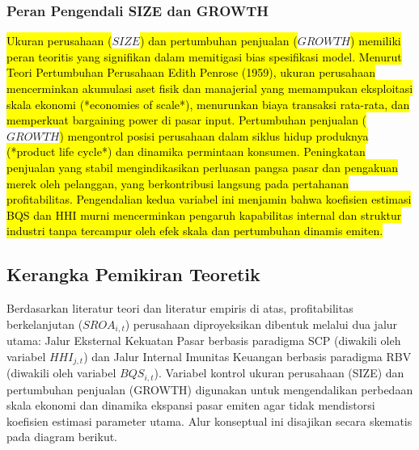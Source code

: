 \documentclass[12pt,a4paper]{article}
\begin{document}
\subsubsection{Peran Pengendali SIZE dan
GROWTH}\label{peran-pengendali-size-dan-growth}

\hl{Ukuran perusahaan (}$SIZE$\hl{) dan pertumbuhan penjualan (}$GROWTH$\hl{) memiliki peran teoritis yang signifikan dalam memitigasi bias spesifikasi model. Menurut Teori Pertumbuhan Perusahaan Edith Penrose (1959), ukuran perusahaan mencerminkan akumulasi aset fisik dan manajerial yang memampukan eksploitasi skala ekonomi (*economies of scale*), menurunkan biaya transaksi rata-rata, dan memperkuat bargaining power di pasar input. Pertumbuhan penjualan (}$GROWTH$\hl{) mengontrol posisi perusahaan dalam siklus hidup produknya (*product life cycle*) dan dinamika permintaan konsumen. Peningkatan penjualan yang stabil mengindikasikan perluasan pangsa pasar dan pengakuan merek oleh pelanggan, yang berkontribusi langsung pada pertahanan profitabilitas. Pengendalian kedua variabel ini menjamin bahwa koefisien estimasi BQS dan HHI murni mencerminkan pengaruh kapabilitas internal dan struktur industri tanpa tercampur oleh efek skala dan pertumbuhan dinamis emiten.}

\subsection{Kerangka Pemikiran
Teoretik}\label{kerangka-pemikiran-teoretik}

Berdasarkan literatur teori dan literatur empiris di atas,
profitabilitas berkelanjutan (\(SROA_{i,t}\)) perusahaan diproyeksikan
dibentuk melalui dua jalur utama: Jalur Eksternal Kekuatan Pasar
berbasis paradigma SCP (diwakili oleh variabel \(HHI_{j,t}\)) dan Jalur
Internal Imunitas Keuangan berbasis paradigma RBV (diwakili oleh
variabel \(BQS_{i,t}\)). Variabel kontrol ukuran perusahaan (SIZE) dan
pertumbuhan penjualan (GROWTH) digunakan untuk mengendalikan perbedaan
skala ekonomi dan dinamika ekspansi pasar emiten agar tidak mendistorsi
koefisien estimasi parameter utama. Alur konseptual ini disajikan secara
skematis pada diagram berikut.
\end{document}
